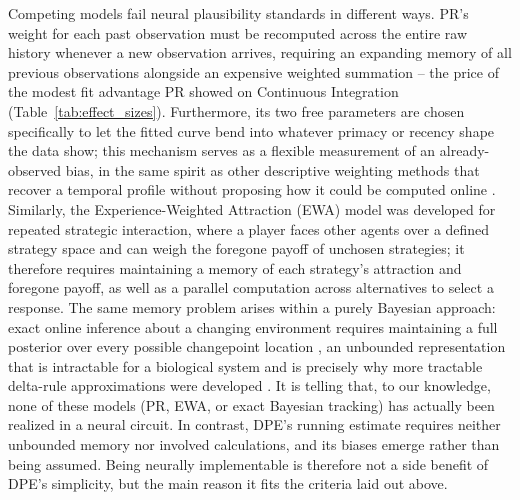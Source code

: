 \documentclass[12pt]{article}
\begin{document}
Competing models fail neural plausibility standards in different ways. PR's weight for each past observation must be recomputed across the entire raw history whenever a new observation arrives, requiring an expanding memory of all previous observations alongside an expensive weighted summation -- the price of the modest fit advantage PR showed on Continuous Integration (Table~\ref{tab:effect_sizes}). Furthermore, its two free parameters are chosen specifically to let the fitted curve bend into whatever primacy or recency shape the data show; this mechanism serves as a flexible measurement of an already-observed bias, in the same spirit as other descriptive weighting methods that recover a temporal profile without proposing how it could be computed online \cite{anderson1965primacy, levi2018strategic, okazawa2018psychophysical}. Similarly, the Experience-Weighted Attraction (EWA) model \cite{camerer1999experience, ho2007selftuning} was developed for repeated strategic interaction, where a player faces other agents over a defined strategy space and can weigh the foregone payoff of unchosen strategies; it therefore requires maintaining a memory of each strategy's attraction and foregone payoff, as well as a parallel computation across alternatives to select a response. The same memory problem arises within a purely Bayesian approach: exact online inference about a changing environment requires maintaining a full posterior over every possible changepoint location \cite{adams2007bayesian}, an unbounded representation that is intractable for a biological system and is precisely why more tractable delta-rule approximations were developed \cite{wilson2013mixture}. It is telling that, to our knowledge, none of these models (PR, EWA, or exact Bayesian tracking) has actually been realized in a neural circuit. In contrast, DPE's running estimate requires neither unbounded memory nor involved calculations, and its biases emerge rather than being assumed. Being neurally implementable is therefore not a side benefit of DPE's simplicity, but the main reason it fits the criteria laid out above.
\end{document}
